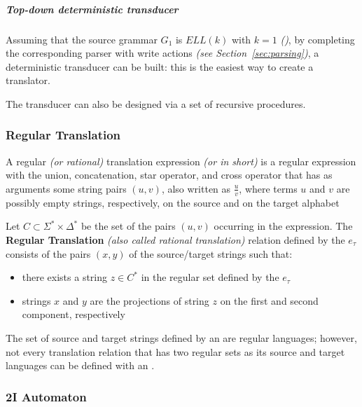\documentclass[english]{article}
\begin{document}
\subparagraph*{Top-down deterministic transducer}

Assuming that the source grammar \(G_1\) is \(\textit{ELL}(k)\) with \(k = 1\) \textit{(\ello)}, by completing the corresponding parser with write actions \textit{(see Section~\ref{sec:parsing})}, a deterministic transducer can be built:
this is the easiest way to create a translator.

The transducer can also be designed via a set of recursive procedures.

\subsubsection{Regular Translation}

A regular \textit{(or rational)} translation expression \textit{(or \rte in short)} is a regular expression with the union, concatenation, star operator, and cross operator that has as arguments some string pairs \(\left( u, v \right)\), also written as \(\frac{u}{v}\), where terms \(u\) and \(v\) are possibly empty strings, respectively, on the source and on the target alphabet

\begin{definition}
  \label{def:regular-translation-expression}
  Let \(C \subset \Sigma^\ast \times \Delta^\ast\) be the set of the pairs \(\left( u, v \right)\) occurring in the expression.
  The \textbf{Regular Translation} \textit{(also called rational translation)} relation defined by the \rte \(e_\tau\) consists of the pairs \(\left( x, y \right)\) of the source/target strings such that:

  \begin{itemize}
    \item there exists a string \(z \in C^\ast\) in the regular set defined by the \rte \(e_\tau\)
    \item strings \(x\) and \(y\) are the projections of string \(z\) on the first and second component, respectively
  \end{itemize}
\end{definition}

The set of source and target strings defined by an \rte are regular languages;
however, not every translation relation that has two regular sets as its source and target languages can be defined with an \rte.

\subsubsection{2I Automaton}
\end{document}
